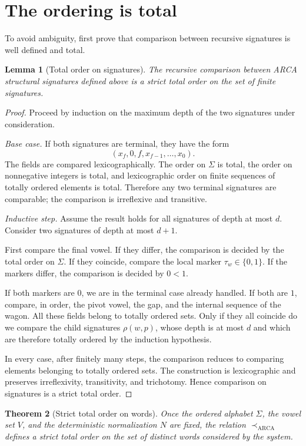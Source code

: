 \documentclass[11pt,a4paper]{article}
\newtheorem{theorem}{Theorem}
\newtheorem{lemma}[theorem]{Lemma}
\theoremstyle{definition}
\theoremstyle{remark}
\newcommand{\ARCA}{\mathrm{ARCA}}
\newcommand{\precA}{\prec_{\ARCA}}
\newcommand{\Nrm}{N}
\newcommand{\localSig}{\rho}
\newcommand{\Tag}{\tau_w}
\begin{document}
\section{The ordering is total}

To avoid ambiguity, first prove that comparison between recursive signatures is well defined and total.

\begin{lemma}[Total order on signatures]
The recursive comparison between ARCA structural signatures defined above is a strict total order on the set of finite signatures.
\end{lemma}

\begin{proof}
Proceed by induction on the maximum depth of the two signatures under consideration.

\emph{Base case.} If both signatures are terminal, they have the form
\[
  (x_f,0,f,x_{f-1},\dots,x_0).
\]
The fields are compared lexicographically. The order on $\Sigma$ is total, the order on nonnegative integers is total, and lexicographic order on finite sequences of totally ordered elements is total. Therefore any two terminal signatures are comparable; the comparison is irreflexive and transitive.

\emph{Inductive step.} Assume the result holds for all signatures of depth at most $d$. Consider two signatures of depth at most $d+1$.

First compare the final vowel. If they differ, the comparison is decided by the total order on $\Sigma$. If they coincide, compare the local marker $\Tag\in\{0,1\}$. If the markers differ, the comparison is decided by $0<1$.

If both markers are $0$, we are in the terminal case already handled. If both are $1$, compare, in order, the pivot vowel, the gap, and the internal sequence of the wagon. All these fields belong to totally ordered sets. Only if they all coincide do we compare the child signatures $\localSig(w,p)$, whose depth is at most $d$ and which are therefore totally ordered by the induction hypothesis.

In every case, after finitely many steps, the comparison reduces to comparing elements belonging to totally ordered sets. The construction is lexicographic and preserves irreflexivity, transitivity, and trichotomy. Hence comparison on signatures is a strict total order.
\end{proof}

\begin{theorem}[Strict total order on words]
Once the ordered alphabet $\Sigma$, the vowel set $V$, and the deterministic normalization $\Nrm$ are fixed, the relation $\precA$ defines a strict total order on the set of distinct words considered by the system.
\end{theorem}
\end{document}
